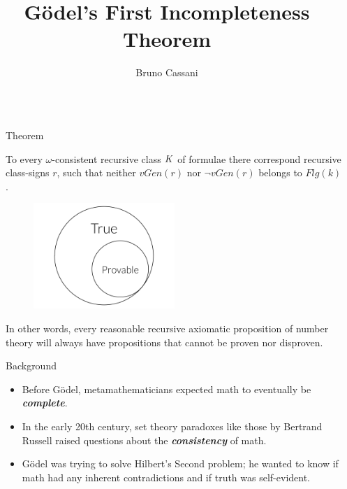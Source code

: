 \documentclass[final]{beamer}
\title{Gödel's First Incompleteness Theorem}
\author{Bruno Cassani}
\institute[shortinst]{\textbf{Morrissey College of Arts and Sciences}, Boston College}
\newlength{\sepwidth}
\newlength{\colwidth}
\newcommand{\separatorcolumn}{\begin{column}{\sepwidth}\end{column}}
\begin{document}
\begin{frame}[t]
\begin{columns}[t]
\separatorcolumn

\begin{column}{\colwidth}


  \begin{alertblock}{Theorem}

    To every $\omega$-consistent recursive class $\small{K}$ of formulae there correspond recursive class-signs $r$, such that neither $vGen(r)$ nor $\neg vGen(r)$ belongs to $Flg(k)$.

    \begin{figure}
      \centering
            \includegraphics[width=0.5\textwidth]{figures/Draw_1.png}
    \end{figure}

    In other words, every reasonable recursive axiomatic proposition of number theory will always have propositions that cannot be proven nor disproven.
    
  \end{alertblock}

  
\begin{block}{Background}

    \begin{itemize}
      \item Before Gödel, metamathematicians expected math to eventually be \textbf{\textit{complete}}.
      \item In the early 20th century, set theory paradoxes like those by Bertrand Russell raised questions about the \textbf{\textit{consistency}} of math.
      \item Gödel was trying to solve Hilbert's Second problem; he wanted to know if math had any inherent contradictions and if truth was self-evident.
        
    \end{itemize}

\end{block}



\end{column}
\end{columns}
\end{frame}
\end{document}

